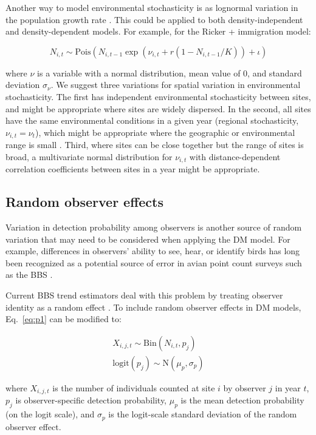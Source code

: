 \documentclass[12pt,english]{article}
\begin{document}
\begin{spacing}{1.9}
\begin{flushleft}
Another way to model environmental stochasticity is as lognormal variation in 
the population growth rate \citep{bjornstad:2001,bonsall_hastings:2004}.  
This could be applied to both density-independent and density-dependent models.
For example, for the Ricker + immigration model:
\begin{linenomath*}
\begin{equation}
N_{i,t} \sim
\mathrm{Pois}(N_{i,t-1}\exp(\nu_{i,t} + r(1-N_{i,t-1}/K)) + \iota)
\label{eq:nuRand}
\end{equation}
\end{linenomath*}
where $\nu$ is a variable with a normal distribution, mean value of 0, and standard deviation $\sigma_\nu$.  
We suggest three variations for spatial variation in environmental stochasticity.  
The first has independent environmental stochasticity 
between sites, and might be appropriate where sites are widely dispersed.  In the second, 
all sites have the same environmental conditions in a given year (regional stochasticity, $\nu_{i,t} = \nu_{t}$),
which might be appropriate where the geographic or environmental range is small \citep{hanski:1998}.  
Third, where sites can be close together but the range of sites is broad, a multivariate normal distribution 
for $\nu_{i,t}$ with distance-dependent correlation coefficients 
between sites in a year might be appropriate.

\subsection*{Random observer effects}

Variation in detection probability among observers is another
source of random variation that may need to be considered when applying
the DM model. For example, differences in observers' ability to see,
hear, or identify birds has long been recognized as a potential source of error
in avian point count surveys such as the BBS 
\citep{robbins_etal:1986,sauer_etal:1994auk,campbell_francis:2011}.

Current BBS trend estimators deal with this problem by
treating observer identity as a random 
effect \citep{link_sauer:2002,sauer_link:2011}.
To include random observer effects in DM models, 
Eq.~\ref{eq:p1} can be modified to:
\begin{linenomath*}
\begin{gather}
X_{i,j,t} \sim \mathrm{Bin}(N_{i,t}, p_j) \nonumber \\
\mathrm{logit}(p_j) \sim \mathrm{N}(\mu_p, \sigma_p)
\label{eq:pobs}
\end{gather}
\end{linenomath*}
where $X_{i,j,t}$ is the number of individuals counted at site $i$ by
observer $j$ in year $t$, $p_j$ is observer-specific detection probability,
$\mu_p$ is the mean detection probability (on the logit scale), and $\sigma_p$ is
the logit-scale standard deviation of the random observer effect. 


\end{flushleft}
\end{spacing}
\end{document}
